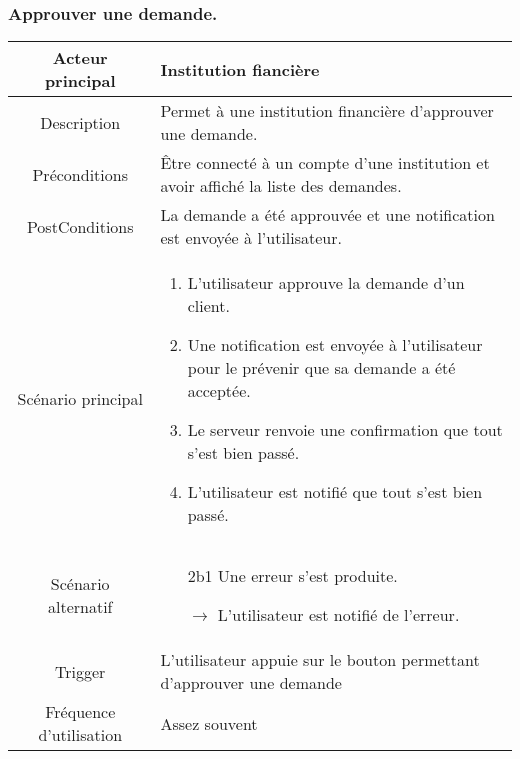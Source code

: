 \documentclass{article}
\begin{document}
\subsubsection{Approuver une demande.}
\begin{table}[h]
   \begin{tabular}{|c|p{10cm}|}
      \hline
      Acteur principal&Institution fiancière\\
      \hline
      Description&Permet à une institution financière d'approuver une demande.\\
      \hline
      Préconditions&Être connecté à un compte d'une institution et avoir affiché la liste des demandes.\\
      \hline
      PostConditions&La demande a été approuvée et une notification est envoyée à l'utilisateur.\\
      \hline
      Scénario principal& 
            \begin{enumerate}
               \item L'utilisateur approuve la demande d'un client.
               \item Une notification est envoyée à l'utilisateur pour le prévenir que sa demande a été acceptée.
               \item Le serveur renvoie une confirmation que tout s'est bien passé.
               \item L'utilisateur est notifié que tout s'est bien passé.
            \end{enumerate}     \\
      \hline
      Scénario alternatif&
            \begin{itemize}
               \item[2b1] Une erreur s'est produite.
               \item[$\rightarrow$] L'utilisateur est notifié de l'erreur.  
            \end{itemize}\\
      \hline
      Trigger&L'utilisateur appuie sur le bouton permettant d'approuver une demande\\
      \hline
      Fréquence d'utilisation&Assez souvent\\
      \hline
   \end{tabular}
\end{table}

\newpage
\end{document}
